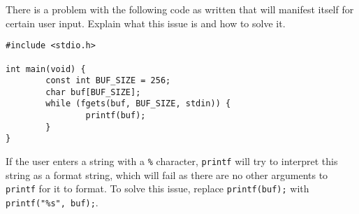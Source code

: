 There is a problem with the following code as written that will manifest itself for certain user input. Explain what this issue is and how to solve it.

\begin{verbatim}
#include <stdio.h>

int main(void) {
        const int BUF_SIZE = 256;
        char buf[BUF_SIZE];
        while (fgets(buf, BUF_SIZE, stdin)) {
                printf(buf);
        }
}
\end{verbatim}

\begin{answer}
If the user enters a string with a \texttt{\%} character, \texttt{printf} will try to interpret this string as a format string, which will fail as there are no other arguments to \texttt{printf} for it to format. To solve this issue, replace \texttt{printf(buf);} with \texttt{printf("\%s", buf);}.
\end{answer}
